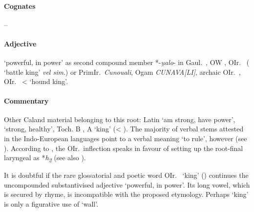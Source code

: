 \documentclass[output=paper,colorlinks,citecolor=brown]{langscibook}
\begin{document}
\paragraph*{Cognates}  -- 

\paragraph*{Adjective} 

 ‘powerful, in power’ as second compound member *-\textit{u̯alo}-  in Gaul.\ , OW , OIr.\   ( ‘battle king’ \textit{vel sim}.) or PrimIr.\ \textit{Cunouali}, Ogam \textit{CUNAVA[LI]}, archaic OIr.\  , OIr.\  <  ‘hound king’.

\paragraph*{Commentary}

Other Caland material  belonging to this root: Latin  ‘am strong, have power’,  ‘strong, healthy’, Toch. B , A  ‘king’ (< ). The majority of verbal stems attested in the Indo-European languages point to a verbal meaning ‘to rule’, however (see ). According to \citet[16]{McCone1991}, the OIr.\  inflection speaks in favour of setting up the root-final laryngeal as *\textit{h\textsubscript{2}} (see also ).

It is doubtful if the rare glossatorial and poetic word OIr.\   ‘king’ () continues the uncompounded substan\-tivised adjective  ‘powerful, in power’. Its long vowel, which is secured by rhyme, is incom\-patible with the proposed etymology. Perhaps  ‘king’ is only a figurative use of  ‘wall’.
\end{document}
